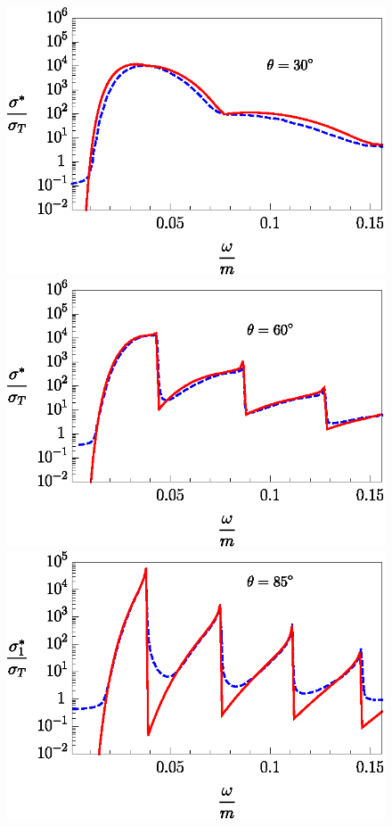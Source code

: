 \documentclass[cp1251%
               ]{jetp} %
\begin{document}
\noindent
\begin{figure}[t!]\centering
\includegraphics[width=0.99\linewidth,clip]{fig4_1.eps}
\includegraphics[width=0.99\linewidth,clip]{fig4_2.eps}
\includegraphics[width=0.99\linewidth,clip]{fig4_3.eps}

\end{figure}
\end{document}
